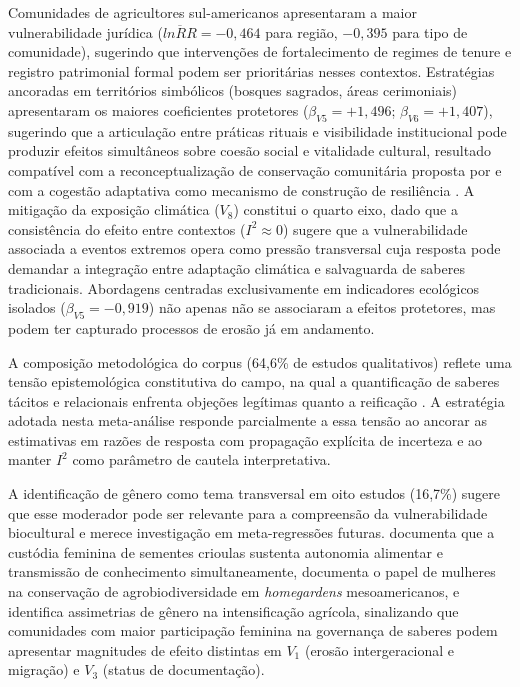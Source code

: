 Comunidades de agricultores sul-americanos apresentaram a maior vulnerabilidade jurídica ($\overline{lnRR} = -0{,}464$ para região, $-0{,}395$ para tipo de comunidade), sugerindo que intervenções de fortalecimento de regimes de tenure e registro patrimonial formal podem ser prioritárias nesses contextos. Estratégias ancoradas em territórios simbólicos (bosques sagrados, áreas cerimoniais) apresentaram os maiores coeficientes protetores ($\beta_{V5} = +1{,}496$; $\beta_{V6} = +1{,}407$), sugerindo que a articulação entre práticas rituais e visibilidade institucional pode produzir efeitos simultâneos sobre coesão social e vitalidade cultural, resultado compatível com a reconceptualização de conservação comunitária proposta por  e com a cogestão adaptativa como mecanismo de construção de resiliência \cite{OlssonFolkeBerkes2004}. A mitigação da exposição climática ($V_8$) constitui o quarto eixo, dado que a consistência do efeito entre contextos ($I^2 \approx 0$) sugere que a vulnerabilidade associada a eventos extremos opera como pressão transversal cuja resposta pode demandar a integração entre adaptação climática e salvaguarda de saberes tradicionais. Abordagens centradas exclusivamente em indicadores ecológicos isolados ($\beta_{V5} = -0{,}919$) não apenas não se associaram a efeitos protetores, mas podem ter capturado processos de erosão já em andamento.

A composição metodológica do corpus (64,6\% de estudos qualitativos) reflete uma tensão epistemológica constitutiva do campo, na qual a quantificação de saberes tácitos e relacionais enfrenta objeções legítimas quanto a reificação \cite{Agrawal2002,GomezBaggethun2013}. A estratégia adotada nesta meta-análise responde parcialmente a essa tensão ao ancorar as estimativas em razões de resposta com propagação explícita de incerteza e ao manter $I^2$ como parâmetro de cautela interpretativa.

A identificação de gênero como tema transversal em oito estudos (16,7\%) sugere que esse moderador pode ser relevante para a compreensão da vulnerabilidade biocultural e merece investigação em meta-regressões futuras.  documenta que a custódia feminina de sementes crioulas sustenta autonomia alimentar e transmissão de conhecimento simultaneamente,  documenta o papel de mulheres na conservação de agrobiodiversidade em \textit{homegardens} mesoamericanos, e  identifica assimetrias de gênero na intensificação agrícola, sinalizando que comunidades com maior participação feminina na governança de saberes podem apresentar magnitudes de efeito distintas em $V_1$ (erosão intergeracional e migração) e $V_3$ (status de documentação).


